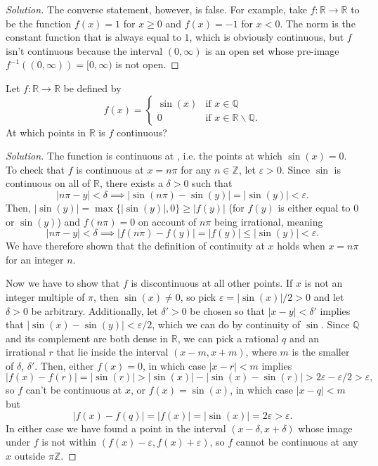 \documentclass[11pt]{scrartcl}
\providecommand{\eps}{\varepsilon}
\providecommand{\QQ}{\mathbb Q}
\providecommand{\RR}{\mathbb R}
\providecommand{\ZZ}{\mathbb Z}
\providecommand{\setdiff}{\smallsetminus}
\providecommand{\inv}{^{-1}}
\newenvironment{soln}{\begin{proof}[Solution]}{\end{proof}}
\begin{document}
\begin{soln}
	The converse statement, however, is false.
	For example, take $f\colon\RR\to\RR$ to be the function
	$f(x) = 1$ for $x\ge 0$ and $f(x) = -1$ for $x < 0$.
	The norm is the constant function that is always equal to $1$,
	which is obviously continuous, but $f$ isn't continuous
	because the interval $(0,\infty)$ is an open set
	whose pre-image $f\inv((0,\infty)) = [0,\infty)$ is not open.
\end{soln}

\begin{problem}
	Let $f\colon\RR\to\RR$ be defined by
	\[f(x) = \begin{cases}
		\sin(x) & \text{if }x\in\QQ\\
		0 & \text{if }x\in\RR\setdiff\QQ.
	\end{cases}\]
	At which points in $\RR$ is $f$ continuous?
\end{problem}

\begin{soln}
	The function is continuous at ,
	i.e. the points at which $\sin(x) = 0$.
	To check that $f$ is continuous at $x = n\pi$ for any $n\in\ZZ$,
	let $\eps > 0$. Since $\sin$ is continuous on all of $\RR$,
	there exists a $\delta > 0$ such that
	\[|n\pi-y| < \delta\implies |\sin(n\pi) - \sin(y)|
	= |\sin (y)| < \eps.\]
	Then, $|\sin(y)| = \max\{|\sin (y)|, 0\} \ge |f(y)|$
	(for $f(y)$ is either equal to $0$ or $\sin(y)$)
	and $f(n\pi) = 0$ on account of $n\pi$ being irrational, meaning
	\[|n\pi - y| < \delta \implies |f(n\pi) - f(y)|
	= |f(y)| \le |\sin(y)| < \eps.\]
	We have therefore shown that the definition of continuity at $x$
	holds when $x = n\pi$ for an integer $n$.
	
	Now we have to show that $f$ is discontinuous at all other points.
	If $x$ is not an integer multiple of $\pi$, then $\sin(x)\ne 0$,
	so pick $\eps = |\sin(x)|/2>0$ and let $\delta > 0$ be arbitrary.
	Additionally, let $\delta' > 0$ be chosen so that
	$|x - y| < \delta'$ implies that $|\sin(x) - \sin(y)| < \eps/2$,
	which we can do by continuity of $\sin$.
	Since $\QQ$ and its complement are both dense in $\RR$,
	we can pick a rational $q$ and an irrational $r$
	that lie inside the interval $(x-m,x+m)$,
	where $m$ is the smaller of $\delta$, $\delta'$.
	Then, either $f(x) = 0$, in which case $|x - r| < m$ implies
	\[|f(x) - f(r)| = |\sin(r)| > |\sin(x)| - |\sin(x) - \sin(r)|
	> 2\eps - \eps/2 > \eps,\]
	so $f$ can't be continuous at $x$,
	or $f(x) = \sin(x)$, in which case $|x - q| < m$ but
	\[|f(x) - f(q)| = |f(x)| = |\sin(x)| = 2\eps > \eps.\]
	In either case we have found a point in the interval $(x-\delta,x+\delta)$
	whose image under $f$ is not within $(f(x)-\eps,f(x)+\eps)$,
	so $f$ cannot be continuous at any $x$ outside $\pi\ZZ$.
\end{soln}
\end{document}
